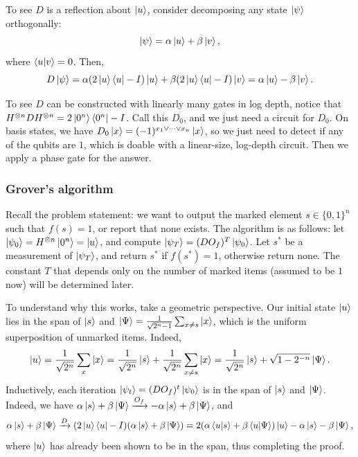 \documentclass[a4paper,draft]{article}
\begin{document}
To see $D$ is a reflection about $\left\lvert u\right\rangle$, consider decomposing any
state $\left\lvert \psi\right\rangle$ orthogonally:
\[
  \left\lvert \psi\right\rangle = \alpha \left\lvert u\right\rangle + \beta \left\lvert v\right\rangle,
\]
where $\left\langle u | v \right\rangle = 0$. Then,
\[
  D \left\lvert \psi\right\rangle
  = \alpha (2 \left\lvert u\right\rangle \left\langle u \right\rvert - I) \left\lvert u\right\rangle
  + \beta (2 \left\lvert u\right\rangle \left\langle u \right\rvert - I) \left\lvert v\right\rangle
  = \alpha \left\lvert u\right\rangle - \beta \left\lvert v\right\rangle.
\]

To see $D$ can be constructed with linearly many gates in log depth,
notice that $H^{\otimes n} D H^{\otimes n} = 2 \left\lvert 0^n\right\rangle \left\langle 0^n \right\rvert - I$.
Call this $D_0$, and we just need a circuit for $D_0$. On basis states, we
have $D_0 \left\lvert x\right\rangle = (-1)^{x_1 \vee \dots \vee x_n} \left\lvert x\right\rangle$, so we just
need to detect if any of the qubits are $1$, which is doable with a
linear-size, log-depth circuit. Then we apply a phase gate for the answer.

\subsubsection*{Grover's algorithm}

Recall the problem statement: we want to output the marked element $s \in
\{0, 1\}^n$ such that $f(s) = 1$, or report that none exists. The
algorithm is as follows: let $\left\lvert \psi_0\right\rangle = H^{\otimes n} \left\lvert 0^n\right\rangle =
\left\lvert u\right\rangle$, and compute $\left\lvert \psi_T\right\rangle = (D O_f)^T \left\lvert \psi_0\right\rangle$. Let
$s^*$ be a measurement of $\left\lvert \psi_T\right\rangle$, and return $s^*$ if $f(s^*) =
1$, otherwise return none. The constant $T$ that depends only on the
number of marked items (assumed to be $1$ now) will be determined later.

To understand why this works, take a geometric perspective. Our initial
state $\left\lvert u\right\rangle$ lies in the span of $\left\lvert s\right\rangle$ and $\left\lvert \Psi\right\rangle =
\frac{1}{\sqrt{2^n - 1}} \sum_{x \neq s} \left\lvert x\right\rangle$, which is the uniform
superposition of unmarked items. Indeed,
\[
  \left\lvert u\right\rangle
  = \frac{1}{\sqrt{2^n}} \sum_x \left\lvert x\right\rangle
  = \frac{1}{\sqrt{2^n}} \left\lvert s\right\rangle + \frac{1}{\sqrt{2^n}} \sum_{x \neq s} \left\lvert x\right\rangle
  = \frac{1}{\sqrt{2^n}} \left\lvert s\right\rangle + \sqrt{1 - 2^{-n}} \left\lvert \Psi\right\rangle.
\]
Inductively, each iteration $\left\lvert \psi_t\right\rangle = (D O_f)^t \left\lvert \psi_0\right\rangle$ is
  in the span of $\left\lvert s\right\rangle$ and $\left\lvert \Psi\right\rangle$. Indeed, we have $\alpha
  \left\lvert s\right\rangle + \beta \left\lvert \Psi\right\rangle \xrightarrow{O_f} - \alpha \left\lvert s\right\rangle + \beta
  \left\lvert \Psi\right\rangle$, and
\[
  \alpha \left\lvert s\right\rangle + \beta \left\lvert \Psi\right\rangle
  \xrightarrow{D} (2 \left\lvert u\right\rangle \left\langle u \right\rvert - I)
  (\alpha \left\lvert s\right\rangle + \beta \left\lvert \Psi\right\rangle)
  = 2 (\alpha \left\langle u | s \right\rangle + \beta \left\langle u | \Psi \right\rangle) \left\lvert u\right\rangle
  - \alpha \left\lvert s\right\rangle - \beta \left\lvert \Psi\right\rangle,
\]
where $\left\lvert u\right\rangle$ has already been shown to be in the span, thus
  completing the proof.
\end{document}
